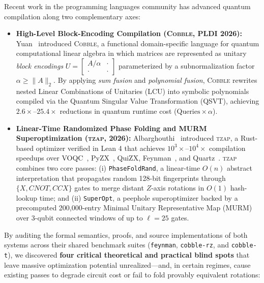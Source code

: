 \documentclass[11pt,a4paper]{article}
\theoremstyle{definition}
\begin{document}
Recent work in the programming languages community has advanced quantum compilation along two complementary axes:
\begin{itemize}
  \item \textbf{High-Level Block-Encoding Compilation (\textsc{Cobble}, PLDI 2026):} Yuan~\cite{yuan2026cobble} introduced \textsc{Cobble}, a functional domain-specific language for quantum computational linear algebra in which matrices are represented as unitary \emph{block encodings} $U = \begin{bmatrix} A/\alpha & \cdot \\ \cdot & \cdot \end{bmatrix}$ parameterized by a subnormalization factor $\alpha \ge \|A\|_2$. By applying \emph{sum fusion} and \emph{polynomial fusion}, \textsc{Cobble} rewrites nested Linear Combinations of Unitaries (LCU) into symbolic polynomials compiled via the Quantum Singular Value Transformation (QSVT), achieving $2.6\times$--$25.4\times$ reductions in quantum runtime cost ($\text{Queries} \times \alpha$).
  \item \textbf{Linear-Time Randomized Phase Folding and MURM Superoptimization (\textsc{tzap}, 2026):} Albarghouthi~\cite{albarghouthi2026rand,albarghouthi2026murm} introduced \textsc{tzap}, a Rust-based optimizer verified in Lean 4 that achieves $10^3\times$--$10^4\times$ compilation speedups over VOQC~\cite{hietala2021}, PyZX~\cite{kissinger2020}, QuiZX, Feynman~\cite{amy2014}, and Quartz~\cite{xu2022quartz}. \textsc{tzap} combines two core passes: (i) \texttt{PhaseFoldRand}, a linear-time $O(n)$ abstract interpretation that propagates random 128-bit fingerprints through $\{X, \mathit{CNOT}, \mathit{CCX}\}$ gates to merge distant $Z$-axis rotations in $O(1)$ hash-lookup time; and (ii) \texttt{SuperOpt}, a peephole superoptimizer backed by a precomputed 200,000-entry Minimal Unitary Representative Map (MURM) over 3-qubit connected windows of up to $\ell = 25$ gates.
\end{itemize}

By auditing the formal semantics, proofs, and source implementations of both systems across their shared benchmark suites (\texttt{feynman}, \texttt{cobble-rz}, and \texttt{cobble-t}), we discovered \textbf{four critical theoretical and practical blind spots} that leave massive optimization potential unrealized---and, in certain regimes, cause existing passes to degrade circuit cost or fail to fold provably equivalent rotations:
\end{document}
